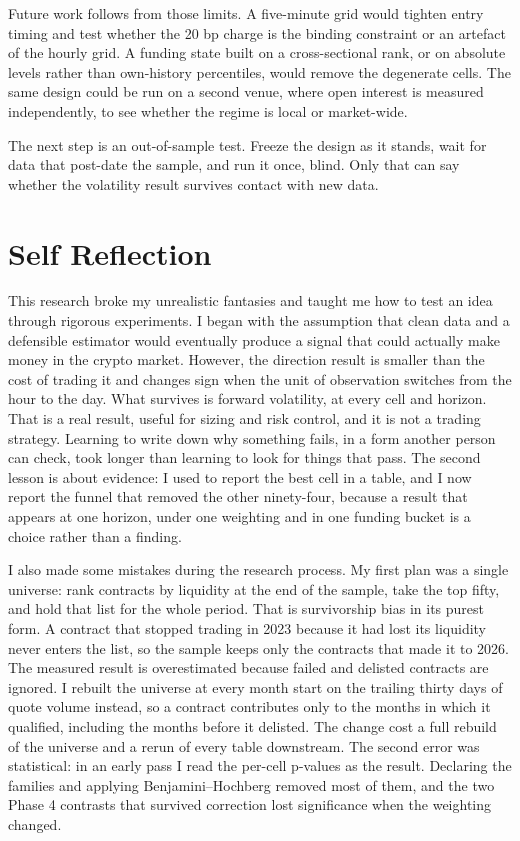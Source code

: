 \documentclass[11pt,a4paper]{article}
\begin{document}
Future work follows from those limits. A five-minute grid would tighten entry timing and test whether the 20 bp charge is the binding constraint or an artefact of the hourly grid. A funding state built on a cross-sectional rank, or on absolute levels rather than own-history percentiles, would remove the degenerate cells. The same design could be run on a second venue, where open interest is measured independently, to see whether the regime is local or market-wide.

The next step is an out-of-sample test. Freeze the design as it stands, wait for data that post-date the sample, and run it once, blind. Only that can say whether the volatility result survives contact with new data.

\bigskip

\section{Self Reflection}

This research broke my unrealistic fantasies and taught me how to test an idea through rigorous experiments. I began with the assumption that clean data and a defensible estimator would eventually produce a signal that could actually make money in the crypto market. However, the direction result is smaller than the cost of trading it and changes sign when the unit of observation switches from the hour to the day. What survives is forward volatility, at every cell and horizon. That is a real result, useful for sizing and risk control, and it is not a trading strategy. Learning to write down why something fails, in a form another person can check, took longer than learning to look for things that pass. The second lesson is about evidence: I used to report the best cell in a table, and I now report the funnel that removed the other ninety-four, because a result that appears at one horizon, under one weighting and in one funding bucket is a choice rather than a finding.

I also made some mistakes during the research process. My first plan was a single universe: rank contracts by liquidity at the end of the sample, take the top fifty, and hold that list for the whole period. That is survivorship bias in its purest form. A contract that stopped trading in 2023 because it had lost its liquidity never enters the list, so the sample keeps only the contracts that made it to 2026. The measured result is overestimated because failed and delisted contracts are ignored. I rebuilt the universe at every month start on the trailing thirty days of quote volume instead, so a contract contributes only to the months in which it qualified, including the months before it delisted. The change cost a full rebuild of the universe and a rerun of every table downstream. The second error was statistical: in an early pass I read the per-cell p-values as the result. Declaring the families and applying Benjamini--Hochberg removed most of them, and the two Phase 4 contrasts that survived correction lost significance when the weighting changed.
\end{document}
